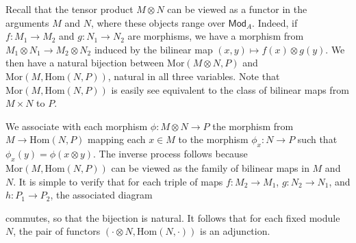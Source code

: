 \begin{example}
    Recall that the tensor product $M \otimes N$ can be viewed as a functor in the arguments $M$ and $N$, where these objects range over $\mathsf{Mod}_A$. Indeed, if $f: M_1 \to M_2$ and $g: N_1 \to N_2$ are morphisms, we have a morphism from $M_1 \otimes N_1 \to M_2 \otimes N_2$ induced by the bilinear map $(x,y) \mapsto f(x) \otimes g(y)$. We then have a natural bijection between $\text{Mor}(M \otimes N, P)$ and $\text{Mor}(M, \text{Hom}(N,P))$, natural in all three variables. Note that $\text{Mor}(M,\text{Hom}(N,P))$ is easily see equivalent to the class of bilinear maps from $M \times N$ to $P$.

    We associate with each morphism $\phi: M \otimes N \to P$ the morphism from $M \to \text{Hom}(N,P)$ mapping each $x \in M$ to the morphism $\phi_x: N \to P$ such that $\phi_x(y) = \phi(x \otimes y)$. The inverse process follows because $\text{Mor}(M,\text{Hom}(N,P))$ can be viewed as the family of bilinear maps in $M$ and $N$. It is simple to verify that for each triple of maps $f: M_2 \to M_1$, $g: N_2 \to N_1$, and $h: P_1 \to P_2$, the associated diagram
    \begin{center}
    \end{center}
    commutes, so that the bijection is natural. It follows that for each fixed module $N$, the pair of functors $(\cdot \otimes N, \text{Hom}(N,\cdot))$ is an adjunction.
\end{example}

